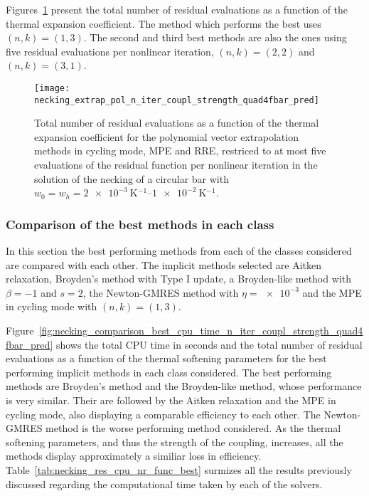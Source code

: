 Figures~\ref{fig:necking_extrap_pol_n_iter_coupl_strength_quad4fbar_pred} present the total number of residual evaluations as a function of the thermal expansion coefficient.
The method which performs the best uses \((n,k)=(1,3)\).
The second and third best methods are also the ones using five residual evaluations per nonlinear iteration, \((n,k)=(2,2)\) and \((n,k)=(3,1)\).

\begin{figure}[htbp]
  \centering
  \texttt{[image: necking\_extrap\_pol\_n\_iter\_coupl\_strength\_quad4fbar\_pred]}
  \caption{Total number of residual evaluations as a function of the thermal expansion coefficient for the polynomial vector extrapolation methods in cycling mode, MPE and RRE, restriced to at most five evaluations of the residual function per nonlinear iteration in the solution of the necking of a circular bar with \(w_0=w_h=\SIrange{2e-3}{1e-2}{\kelvin^{-1}}\).}
\label{fig:necking_extrap_pol_n_iter_coupl_strength_quad4fbar_pred}
\end{figure}

\FloatBarrier

\subsubsection{Comparison of the best methods in each class}

In this section the best performing methods from each of the classes considered are compared with each other.
The implicit methods selected are Aitken relaxation, Broyden's method with Type I update, a Broyden-like method with \(\beta=-1\) and \(s=2\), the Newton-GMRES method with \(\eta=\num{e-3}\) and the MPE in cycling mode with \((n,k)=(1,3)\).

Figure~\ref{fig:necking_comparison_best_cpu_time_n_iter_coupl_strength_quad4fbar_pred} shows the total CPU time in seconds and the total number of residual evaluations as a function of the thermal softening parameters for the  best performing implicit methods in each class considered.
The best performing methods are Broyden's method and the Broyden-like method, whose performance is very similar.
Their are followed by the Aitken relaxation and the MPE in cycling mode, also displaying a comparable efficiency to each other.
The Newton-GMRES method is the worse performing method considered.
As the thermal softening parameters, and thus the strength of the coupling, increases, all the methods display approximately a similiar loss in efficiency.
Table~\ref{tab:necking_res_cpu_nr_func_best} surmizes all the results previously discussed regarding the computational time taken by each of the solvers.

